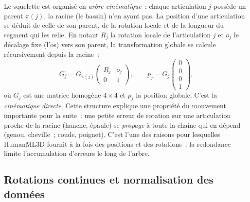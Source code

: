 \documentclass[12pt,a4paper,oneside]{report}
\theoremstyle{definition}
\theoremstyle{plain}
\begin{document}
Le squelette est organisé en \emph{arbre cinématique}~: chaque articulation $j$
possède un parent $\pi(j)$, la racine (le bassin) n'en ayant pas. La position d'une
articulation se déduit de celle de son parent, de la rotation locale et de la
longueur du segment qui les relie. En notant $R_j$ la rotation locale de
l'articulation $j$ et $o_j$ le décalage fixe (l'os) vers son parent, la
transformation globale se calcule récursivement depuis la racine~:
\begin{equation}
G_j = G_{\pi(j)}\begin{pmatrix} R_j & o_j\\ 0 & 1\end{pmatrix},\qquad
p_j = G_j\begin{pmatrix}0\\0\\0\\1\end{pmatrix},
\label{eq:fk}
\end{equation}
où $G_j$ est une matrice homogène $4\times4$ et $p_j$ la position globale. C'est la
\emph{cinématique directe}. Cette structure explique une propriété du mouvement
importante pour la suite~: une petite erreur de rotation sur une articulation
proche de la racine (hanche, épaule) se \emph{propage} à toute la chaîne qui en
dépend (genou, cheville~; coude, poignet). C'est l'une des raisons pour lesquelles
HumanML3D fournit à la fois des positions et des rotations~: la redondance limite
l'accumulation d'erreurs le long de l'arbre.

\subsection{Rotations continues et normalisation des données}
\label{sub:rotations}
\end{document}
